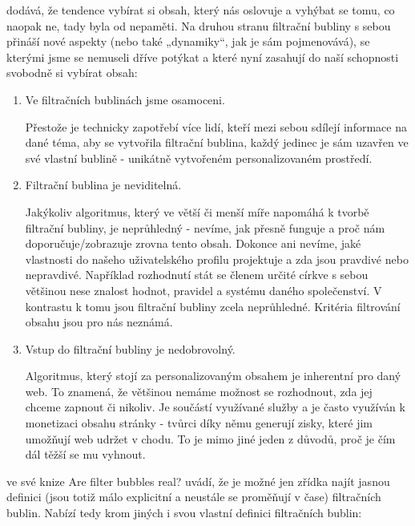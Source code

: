    
    \cite{Pariser2011} dodává, že tendence vybírat si obsah, který nás oslovuje a vyhýbat se tomu, co naopak ne, tady byla od nepaměti. Na druhou stranu filtrační bubliny s sebou přináší nové aspekty (nebo také „dynamiky“, jak je sám pojmenovává), se kterými jsme se nemuseli dříve potýkat a které nyní zasahují do naší schopnosti svobodně si vybírat obsah: 
    
    \begin{enumerate}
      \item Ve filtračních bublinách jsme osamoceni.
      
      Přestože je technicky zapotřebí více lidí, kteří mezi sebou sdílejí informace na dané téma, aby se vytvořila filtrační bublina, každý jedinec je sám uzavřen ve své vlastní bublině - unikátně vytvořeném personalizovaném prostředí. 
      
      \item Filtrační bublina je neviditelná.
      
      Jakýkoliv algoritmus, který ve větší či menší míře napomáhá k tvorbě filtrační bubliny, je neprůhledný - nevíme, jak přesně funguje a proč nám doporučuje/zobrazuje zrovna tento obsah. Dokonce ani nevíme, jaké vlastnosti do našeho uživatelského profilu projektuje a zda jsou pravdivé nebo nepravdivé. Například rozhodnutí stát se členem určité církve s sebou většinou nese znalost hodnot, pravidel a systému daného společenství. V kontrastu k tomu jsou filtrační bubliny zcela neprůhledné. Kritéria filtrování obsahu jsou pro nás neznámá.
      
      \item Vstup do filtrační bubliny je nedobrovolný.
      
      Algoritmus, který stojí za personalizovaným obsahem je inherentní pro daný web. To znamená, že většinou nemáme možnost se rozhodnout, zda jej chceme zapnout či nikoliv. Je součástí využívané služby a je často využíván k monetizaci obsahu stránky - tvůrci díky němu generují zisky, které jim umožňují web udržet v chodu. To je mimo jiné jeden z důvodů, proč je čím dál těžší se mu vyhnout. 
      
    \end{enumerate}

    \cite{Bruns} ve své knize Are filter bubbles real? uvádí, že je možné jen zřídka najít jasnou definici (jsou totiž málo explicitní a neustále se proměňují v čase) filtračních bublin. Nabízí tedy krom jiných i svou vlastní definici filtračních bublin:
    
